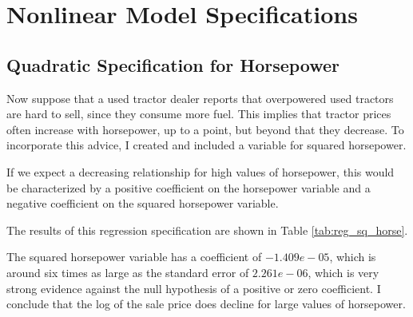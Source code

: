 \documentclass[11pt]{paper}
\begin{document}
\section{Nonlinear Model Specifications}

%
%
%
%

\subsection{Quadratic Specification for Horsepower}

Now suppose that 
a used tractor dealer reports that overpowered used tractors are hard to sell, since they consume more fuel. 
This implies that tractor prices often increase with horsepower, up to a point, but beyond that they decrease. 
To incorporate this advice, I created and included a variable for squared horsepower. 

If we expect a decreasing relationship for high values of horsepower, 
this would be characterized by 
a positive coefficient on the horsepower variable and
a negative coefficient on the squared horsepower variable. 

The results of this regression specification are shown in 
Table \ref{tab:reg_sq_horse}. 
% 

% 
The squared horsepower variable has a coefficient of $-1.409e-05$, which is around six times as large as the standard error of $2.261e-06$, which is very strong evidence against the null hypothesis of a positive or zero coefficient. 
I conclude that the log of the sale price does decline for large values of horsepower. 
\end{document}
